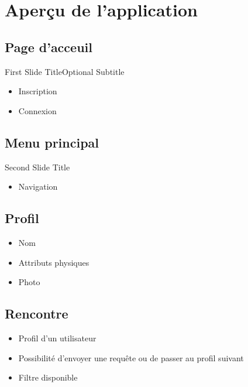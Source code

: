 \documentclass{beamer}
\begin{document}
\section{Aperçu de l'application}

\subsection{Page d'acceuil}

\begin{frame}{First Slide Title}{Optional Subtitle}
  \begin{itemize}
  \item {
    Inscription
  }
  \item {
    Connexion
  }
  \end{itemize}
\end{frame}

\subsection{Menu principal}

\begin{frame}{Second Slide Title}
  \begin{itemize}
  \item {
	Navigation
  }
  \end{itemize}
\end{frame}

\subsection{Profil}

\begin{frame}

	\begin{itemize}
	
	\item{
	Nom	
	}
	\item{
	Attributs physiques	
	}
	
	\item{
	Photo
	}
	\end{itemize}

\end{frame}

\subsection{Rencontre}
\begin{frame}
	\begin{itemize}
	\item{
	Profil d'un utilisateur
	}
	\item{
	Possibilité d'envoyer une requête ou de passer au profil suivant
	}
	\item{
	Filtre disponible
	}
	\end{itemize}
\end{frame}
\end{document}
